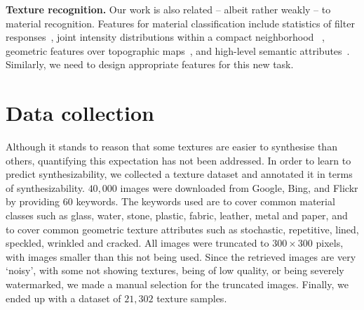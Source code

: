 \textbf{Texture recognition.}  Our work is also related -- albeit
rather weakly -- to material recognition. Features for material
classification include statistics of filter
responses~\citep{texton:2001, Manjunath96, Schmid01}, joint intensity
distributions within a compact neighborhood ~\citep{material:pami:09,
  sorted:texture}, geometric features over topographic
maps~\citep{xia:texture}, and high-level semantic
attributes~\citep{semantic:texture}.  Similarly, we need
to design appropriate features for this new task.



\section{Data collection}
\label{te:sec:data}
Although it stands to reason that some textures are easier to
synthesise than others, quantifying this expectation has not been
addressed. In order to learn to predict synthesizability, we collected
a texture dataset and annotated it in terms of
synthesizability. $40,000$ images were downloaded from Google, Bing,
and Flickr by providing $60$ keywords. The keywords used are to cover
common material classes such as glass, water, stone, plastic, fabric,
leather, metal and paper, and to cover common geometric texture
attributes such as stochastic, repetitive, lined, speckled, wrinkled
and cracked. All images were truncated to $300 \times 300$ pixels,
with images smaller than this not being used. Since the retrieved
images are very `noisy', with some not showing textures, being of low
quality, or being severely watermarked, we made a manual selection for
the truncated images. Finally, we ended up with a dataset of $21,302$
texture samples.

